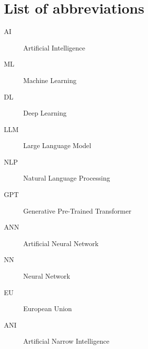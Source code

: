 \chapter*{List of abbreviations}

\begin{description}
    \item[AI] Artificial Intelligence
\end{description}

\begin{description}
    \item[ML] Machine Learning
\end{description}

\begin{description}
    \item[DL] Deep Learning
\end{description}

\begin{description}
    \item[LLM] Large Language Model
\end{description}

\begin{description}
    \item[NLP] Natural Language Processing
\end{description}

\begin{description}
    \item[GPT] Generative Pre-Trained Transformer
\end{description}

\begin{description}
    \item[ANN] Artificial Neural Network
\end{description}

\begin{description}
    \item[NN] Neural Network 
\end{description}

\begin{description}
    \item[EU] European Union 
\end{description}

\begin{description}
    \item[ANI] Artificial Narrow Intelligence 
\end{description}

